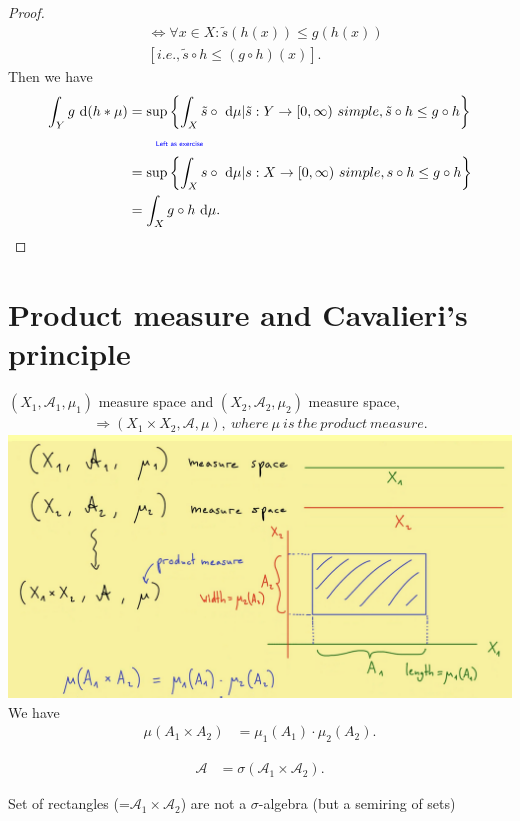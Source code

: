 \documentclass[../../note.tex]{subfiles}
\begin{document}
\begin{proof}
\begin{align}
        &\Longleftrightarrow \forall x \in X: \tilde{s}(h(x)) \leq g(h(x)) \\
        &[i.e., \tilde{s} \circ h \leq (g \circ h)(x)].
    \end{align}
    Then we have
    \begin{align}
        \int_Y g~{\rm d}(h * \mu) 
        &= \sup\left\{\int_X \tilde{s}\circ~{\rm d}\mu \vert \tilde{s}: Y \rightarrow [0,\infty)~simple,\tilde{s} \circ h \leq g \circ h\right\} \\
        &\qquad\text{\color{blue}{\tiny\sffamily Left as exercise}} \nonumber \\
        &= \sup\left\{\int_X {s}\circ~{\rm d}\mu \vert {s}: X \rightarrow [0,\infty)~simple,{s} \circ h \leq g \circ h\right\} \\
        &= \int_X g \circ h~{\rm d}\mu.
    \end{align}
\end{proof}

\section{Product measure and Cavalieri's principle}
$(X_1,\mathcal{A}_1,\mu_1)$ measure space and $(X_2,\mathcal{A}_2,\mu_2)$ measure space,
\begin{align}
    \Longrightarrow (X_1 \times X_2, \mathcal{A}, \mu),~where~\mu~is~the~product~measure.
\end{align}
\includegraphics[scale=0.4]{../figures/Product measure.png}
We have
\begin{align}
    \mu(A_1 \times A_2)
    &= \mu_1(A_1) \cdot \mu_2(A_2).
\end{align}
\begin{definition}
    \label{Product sigma-algebra}
    \begin{align}
        \mathcal{A}
        &= \sigma(\mathcal{A}_1 \times \mathcal{A}_2).
    \end{align}    
\end{definition}
\begin{remark}
    Set of rectangles (=$\mathcal{A}_1 \times \mathcal{A}_2$) are not a $\sigma$-algebra (but a semiring of sets)
\end{remark}
\end{document}
